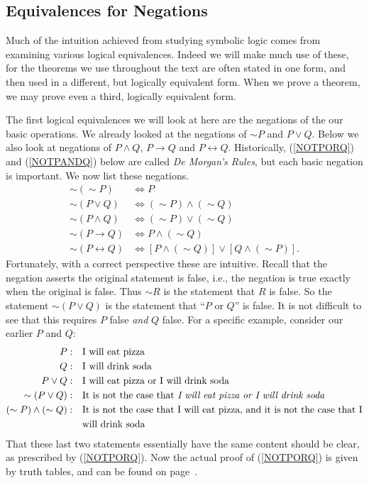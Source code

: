 \subsection{Equivalences for Negations}
Much of the intuition achieved from studying symbolic logic
comes from examining various logical equivalences.
Indeed we will make much use of these, for the  theorems
we use throughout the text are often stated in one form,
and then used in a different, but logically equivalent form.
When we prove a theorem, we may prove even a third,
logically equivalent form.

The first logical equivalences we will look at here are
the negations of the our basic operations.  
We already looked
at the negations of $\sim P$ and $P\vee Q$.  Below we
also look at negations of
$P\wedge Q$, $P\longrightarrow Q$ and $P\longleftrightarrow Q$.
Historically, (\ref{NOTPORQ}) and (\ref{NOTPANDQ}) below are called
{\it De Morgan's Rules}, but each basic negation is important.
We now list these negations.
\begin{align}
\sim(\sim P)&\iff P\label{NOTNOTP}\\
\sim(P\vee Q)&\iff(\sim P)\wedge(\sim Q)\label{NOTPORQ}\\
\sim(P\wedge Q)&\iff (\sim P)\vee(\sim Q)\label{NOTPANDQ}\\
\sim(P\longrightarrow Q)&\iff P\wedge(\sim Q)\label{NOTP->Q}\\
\sim(P\longleftrightarrow Q)&\iff[P\wedge(\sim Q)]\vee[Q\wedge(\sim P)].
\label{NOTP<->Q}\end{align}
Fortunately, with a correct perspective these are intuitive.
Recall that the negation asserts the original statement is false,
i.e., the negation is true exactly when the original is false.
Thus $\sim R$ is the statement that $R$ is false.
So the statement $\sim (P\vee Q)$ is the statement that
``$P$ or $Q$'' is false.  It is not difficult to
see that this requires $P$ false {\it and}
$Q$ false.  For a specific example,
consider our earlier $P$ and $Q$:
\begin{align*}
P:&\quad\text{I will eat  pizza}\\
Q:&\quad\text{I will drink soda}\\
P\vee Q:&\quad\text{I will eat pizza or I will drink soda}\\
\sim(P\vee Q):&\quad\text{It is not the case that \emph{I will
              eat pizza or I will drink soda}}\\
(\sim P)\wedge(\sim Q):&\quad
\text{It is not the case that I will eat pizza, and 
      it is not the case that I}\\
              &\quad\text{will drink soda}
\end{align*}
That these last two statements essentially have the same content
should be clear, as prescribed by (\ref{NOTPORQ}). 
Now the actual proof of (\ref{NOTPORQ}) is given by truth tables, 
and can be found on page~\pageref{TableForSimPOrQ}.

